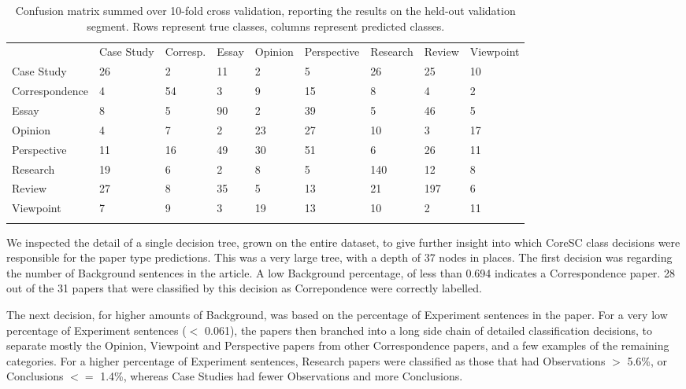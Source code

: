\documentclass{svmult}
\begin{document}
\begin{table}
\caption{Confusion matrix summed over 10-fold cross validation, reporting the results on the held-out validation segment. Rows represent true classes, columns represent predicted classes.}
\label{tab:confusion}       %
\begin{tabular}{lllllllll}
\hline\noalign{\smallskip}
      &  Case Study   &     Corresp.      &   Essay  & Opinion &     Perspective    &     Research    &     Review  & Viewpoint \\
\noalign{\smallskip}\svhline\noalign{\smallskip}
Case Study    &    26   &     2     &   11    &    2  &      5 & 26       & 25 &       10 \\
Correspondence  &      4  &      54   &     3    &    9     &   15 & 8   &     4 &       2 \\
Essay      &  8     &   5    &   90    &    2 &       39      &  5 & 46    &    5 \\
Opinion    &    4   &     7 &       2   &     23      &  27     &   10   &  3  &      17 \\
Perspective &       11  &      16    &    49       & 30      &  51 & 6      &  26    &   11 \\
Research      &  19    &    6 &       2 &       8    &    5      &  140  &   12    &    8\\
Review       & 27     &   8     &   35    &    5      &  13    &    21   &  197 &       6\\
Viewpoint    &    7  &      9   &     3     &   19     &   13 & 10     &   2  &      11 \\
\noalign{\smallskip}\hline\noalign{\smallskip}
\end{tabular}
\end{table}




We inspected the detail of a single decision tree, grown on the entire dataset, to give further insight into which CoreSC class decisions were responsible for the paper type predictions. This was a very large tree, with a depth of 37 nodes in places.  The first decision was regarding the number of Background sentences in the article. A low Background percentage, of less than 0.694 indicates a Correspondence paper. 28 out of the 31 papers that were classified by this decision as Correpondence were correctly labelled. 

The next decision, for higher amounts of Background, was based on the percentage of Experiment sentences in the paper. For a very low percentage of Experiment sentences ($<$ 0.061), the papers then branched into a long side chain of detailed classification decisions, to separate mostly the Opinion, Viewpoint and Perspective papers from other Correspondence papers, and a few examples of the remaining categories. For a higher percentage of Experiment sentences, Research papers were classified as those that had Observations $>$ 5.6\%, or Conclusions  $<=$ 1.4\%, whereas Case Studies had fewer Observations and more Conclusions.
\end{document}
